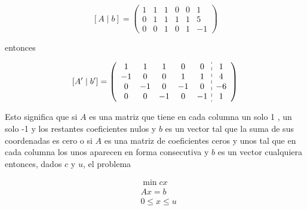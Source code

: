 \documentclass[10pt]{article}
\begin{document}
$$
[A \mid b]=\left(\begin{array}{ccccc|c}
1 & 1 & 1 & 0 & 0 & 1 \\
0 & 1 & 1 & 1 & 1 & 5 \\
0 & 0 & 1 & 0 & 1 & -1
\end{array}\right)
$$

entonces

$$
\left[A^{\prime} \mid b^{\prime}\right]=\left(\begin{array}{ccccc:c}
1 & 1 & 1 & 0 & 0 & 1 \\
-1 & 0 & 0 & 1 & 1 & 4 \\
0 & -1 & 0 & -1 & 0 & -6 \\
0 & 0 & -1 & 0 & -1 & 1
\end{array}\right)
$$

Esto significa que si $A$ es una matriz que tiene en cada columna un solo 1 , un solo -1 y los restantes coeficientes nulos y $b$ es un vector tal que la suma de sus coordenadas es cero o si $A$ es una matriz de coeficientes ceros y unos tal que en cada columna los unos aparecen en forma consecutiva y $b$ es un vector cualquiera entonces, dados $c$ y $u$, el problema

$$
\begin{aligned}
& \min c x \\
& A x=b \\
& 0 \leq x \leq u
\end{aligned}
$$
\end{document}

